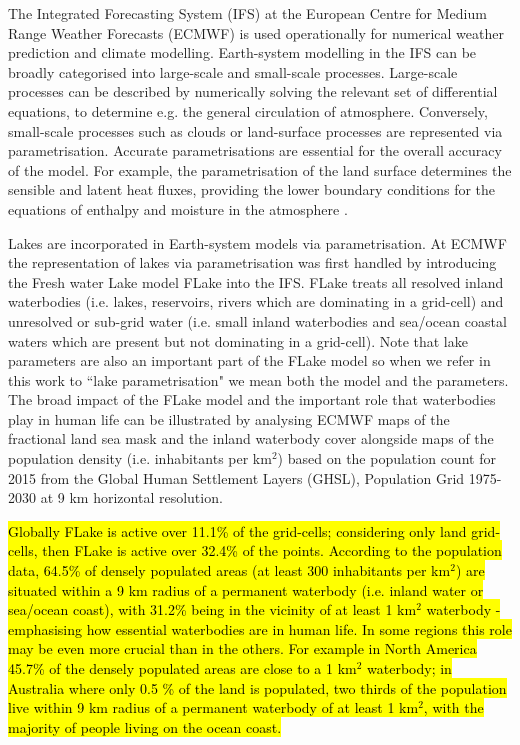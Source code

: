 \documentclass[hess, twostagejnl]{copernicus}
\begin{document}
\noindent The Integrated Forecasting System (IFS) at the European Centre for Medium Range Weather Forecasts (ECMWF) is used operationally for numerical weather prediction and climate modelling. Earth-system modelling in the IFS can be broadly categorised into large-scale and small-scale processes. Large-scale processes can be described by numerically solving the relevant set of differential equations, to determine e.g. the general circulation of atmosphere. Conversely, small-scale processes such as clouds or land-surface processes are represented via parametrisation. Accurate parametrisations are essential for the overall accuracy of the model. For example, the parametrisation of the land surface determines the sensible and latent heat fluxes, providing the lower boundary conditions for the equations of enthalpy and moisture in the atmosphere \citep{p16960}. \newline 

\noindent Lakes are incorporated in Earth-system models via parametrisation. At ECMWF the  representation of lakes via parametrisation was first handled by introducing the Fresh water Lake model FLake \citep{Mironov2008} into the IFS. FLake treats all resolved inland waterbodies (i.e. lakes, reservoirs, rivers which are dominating in a grid-cell) and unresolved or sub-grid water (i.e. small inland waterbodies and sea/ocean coastal waters which are present but not dominating in a grid-cell). Note that lake parameters are also an important part of the FLake model so when we refer in this work to ``lake parametrisation" we mean both the model and the parameters. The broad impact of the FLake model and the important role that waterbodies play in human life can be illustrated by analysing ECMWF maps of the fractional land sea mask and the inland waterbody cover alongside maps of the population density (i.e. inhabitants per km$^2$) based on the population count for 2015 from the Global Human Settlement Layers (GHSL), Population Grid 1975-2030 \citep{GHS,JRC100523} at 9 km horizontal resolution. 


\hl{Globally FLake is active over 11.1\% of the grid-cells; considering only land grid-cells, then FLake is active over 32.4\% of the points. According to the population data, 64.5\% of densely populated areas (at least 300 inhabitants per km$^2$) are situated within a 9 km radius of a permanent waterbody (i.e. inland water or sea/ocean coast), with 31.2\% being in the vicinity of at least 1 km$^2$ waterbody - emphasising how essential waterbodies are in human life. In some regions this role may be even more crucial than in the others. For example in North America 45.7\% of the densely populated areas are close to a 1 km$^2$ waterbody; in Australia where only 0.5 \% of the land is populated,  two thirds of the population live within 9 km radius of a permanent waterbody of at least 1 km$^2$, with the majority of people living on the ocean coast.} \newline 
\end{document}
